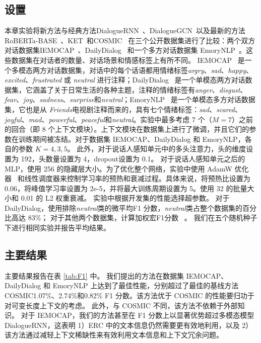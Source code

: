 \subsection{设置}
本章实验将新方法与经典方法DialogueRNN~\cite{majumder2019dialoguernn}、DialogueGCN~\cite{ghosal2019dialoguegcn}以及最新的方法RoBERTa-BASE~\cite{liu2019roberta}、KET~\cite{zhong2019knowledge}和COSMIC~\cite{ghosal2020cosmic} 在三个公开数据集进行了比较：两个双方对话数据集IEMOCAP~\cite{busso2008iemocap}、DailyDialog~\cite{li2017dailydialog} 和一个多方对话数据集 EmoryNLP~\cite{zahiri2017emotion}。这些数据集在对话者的数量、对话场景和情感标签上有所不同。 IEMOCAP~\cite{busso2008iemocap} 是一个多模态两方对话数据集，对话中的每个话语都用情绪标签\textit{argry}、\textit{sad}、\textit{happy}、\textit{excited}、\textit{frustrated} 或 \textit{neutral} 进行注释；DailyDialog~\cite{li2017dailydialog} 是一个单模态两方对话数据集，它涵盖了关于日常生活的各种主题，注释的情绪标签有\textit{anger}、\textit{disgust}、\textit{fear}、\textit{joy}、\textit{sadness}、\textit{surprise}和\textit{neutral}；EmoryNLP~\cite{zahiri2017emotion} 是一个单模态多方对话数据集，它也是从 \textit{Friends}电视剧注释而来的，具有七个情绪标签：\textit{sad}、\textit{scared}、\textit{joyful}、\textit{mad}、\textit{powerful}、\textit{peaceful}和\textit{neutral}。实验中最多考虑 7 个（$M=7$）之前的回合（即 8 个上下文模块）。上下文模块在数据集上进行了微调，并且它们的参数在训练期间被冻结。对于数据集 IEMOCAP、DailyDialog 和 EmoryNLP，各自的参数 $K=4,3,5$。 此外，对于说话人感知单元中的多头注意力，头的维度设置为 192，头数量设置为 4，dropout设置为 0.1。 对于说话人感知单元之后的 MLP，使用 256 的隐藏层大小。为了优化整个网络，实验中使用 AdamW 优化器~\cite{loshchilov2017decoupled} 和线性调度器来控制学习率的预热和衰减过程。具体来说，将预热比设置为 0.06，将峰值学习率设置为 2e-5，并将最大训练周期设置为 5。使用 32 的批量大小和 0.01 的 L2 权重衰减。 实验中根据开发集的性能选择超参数。 对于 DailyDialog，使用排除\textit{neutral}类的微平均F1 分数，\textit{neutral}类占整个数据集的百分比高达 83\%； 对于其他两个数据集，计算加权宏F1分数 ~\cite{zhong2019knowledge,ishiwatari2020relation}。 我们在五个随机种子下进行相同实验并报告平均结果。

\subsection{主要结果}
主要结果报告在表 \ref{tab:F1} 中。 我们提出的方法在数据集 IEMOCAP、DailyDialog 和 EmoryNLP 上达到了最佳性能，分别超过了最佳的基线方法COSMIC1.07\%、2.74\%和0.82\% F1 分数。该方法优于 COSMIC 的性能要归功于对可变长度上下文的考虑。 此外，与 COSMIC 不同，该方法不依赖于外部知识。 对于 IEMOCAP，我们的方法甚至在 F1 分数上以显著优势超过多模态模型 DialogueRNN，这表明 1）ERC 中的文本信息仍然需要更有效地利用，以及 2）该方法通过减轻上下文稀缺性来有效利用文本信息和上下文冗余问题。

